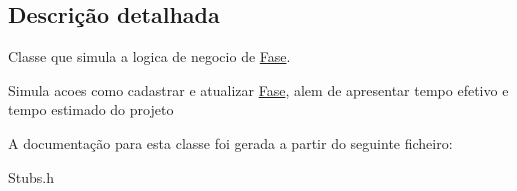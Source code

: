 \subsection{\-Descrição detalhada}
\-Classe que simula a logica de negocio de \hyperlink{class_fase}{\-Fase}. 

\-Simula acoes como cadastrar e atualizar \hyperlink{class_fase}{\-Fase}, alem de apresentar tempo efetivo e tempo estimado do projeto 

\-A documentação para esta classe foi gerada a partir do seguinte ficheiro\-:\begin{DoxyCompactItemize}
\item 
\-Stubs.\-h\end{DoxyCompactItemize}
